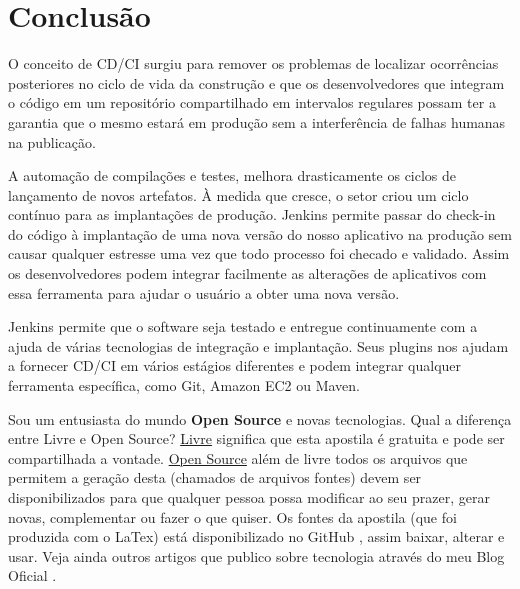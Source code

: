 \documentclass[a4paper,11pt]{article}
\begin{document}
\section{Conclusão}
O conceito de CD/CI surgiu para remover os problemas de localizar ocorrências posteriores no ciclo de vida da construção e que os desenvolvedores que integram o código em um repositório compartilhado em intervalos regulares possam ter a garantia que o mesmo estará em produção sem a interferência de falhas humanas na publicação. 

A automação de compilações e testes, melhora drasticamente os ciclos de lançamento de novos artefatos. À medida que cresce, o setor criou um ciclo contínuo para as implantações de produção. Jenkins permite passar do check-in do código à implantação de uma nova versão do nosso aplicativo na produção sem causar qualquer estresse uma vez que todo processo foi checado e validado. Assim os desenvolvedores podem integrar facilmente as alterações de aplicativos com essa ferramenta para ajudar o usuário a obter uma nova versão. 

Jenkins permite que o software seja testado e entregue continuamente com a ajuda de várias tecnologias de integração e implantação. Seus plugins nos ajudam a fornecer CD/CI em vários estágios diferentes e podem integrar qualquer ferramenta específica, como Git, Amazon EC2 ou Maven. 

Sou um entusiasta do mundo \textbf{Open Source} e novas tecnologias. Qual a diferença entre Livre e Open Source? \underline{Livre} significa que esta apostila é gratuita e pode ser compartilhada a vontade. \underline{Open Source} além de livre todos os arquivos que permitem a geração desta (chamados de arquivos fontes) devem ser disponibilizados para que qualquer pessoa possa modificar ao seu prazer, gerar novas, complementar ou fazer o que quiser. Os fontes da apostila (que foi produzida com o LaTex) está disponibilizado no GitHub \cite{github}, assim baixar, alterar e usar. Veja ainda outros artigos que publico sobre tecnologia através do meu Blog Oficial \cite{fernandoanselmo}.
\end{document}
